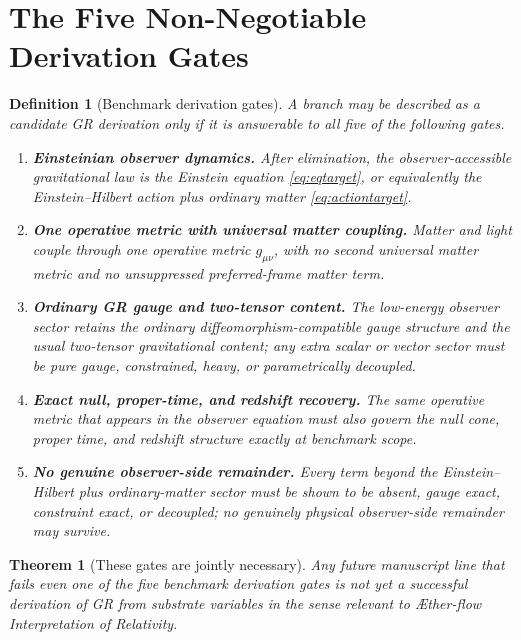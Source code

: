 \documentclass[11pt]{article}
\newcommand{\Aflow}{\AE{}ther-flow}
\newcommand{\TheoryName}{\Aflow{} Interpretation of Relativity}
\newcommand{\ObserverMetric}{g_{\mu\nu}}
\newtheorem{definition}{Definition}
\newtheorem{theorem}{Theorem}
\begin{document}
\section{The Five Non-Negotiable Derivation Gates}

\begin{definition}[Benchmark derivation gates]
A branch may be described as a \emph{candidate GR derivation} only if it is answerable to all five of the following gates.
\begin{enumerate}
    \item \textbf{Einsteinian observer dynamics.} After elimination, the observer-accessible gravitational law is the Einstein equation \eqref{eq:eqtarget}, or equivalently the Einstein--Hilbert action plus ordinary matter \eqref{eq:actiontarget}.
    \item \textbf{One operative metric with universal matter coupling.} Matter and light couple through one operative metric \(\ObserverMetric\), with no second universal matter metric and no unsuppressed preferred-frame matter term.
    \item \textbf{Ordinary GR gauge and two-tensor content.} The low-energy observer sector retains the ordinary diffeomorphism-compatible gauge structure and the usual two-tensor gravitational content; any extra scalar or vector sector must be pure gauge, constrained, heavy, or parametrically decoupled.
    \item \textbf{Exact null, proper-time, and redshift recovery.} The same operative metric that appears in the observer equation must also govern the null cone, proper time, and redshift structure exactly at benchmark scope.
    \item \textbf{No genuine observer-side remainder.} Every term beyond the Einstein--Hilbert plus ordinary-matter sector must be shown to be absent, gauge exact, constraint exact, or decoupled; no genuinely physical observer-side remainder may survive.
\end{enumerate}
\end{definition}

\begin{theorem}[These gates are jointly necessary]
Any future manuscript line that fails even one of the five benchmark derivation gates is not yet a successful derivation of GR from substrate variables in the sense relevant to \TheoryName{}.
\end{theorem}
\end{document}
